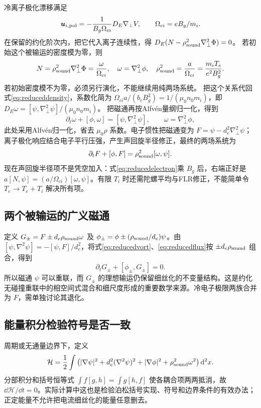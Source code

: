 \documentclass[UTF8,a4paper,11pt,openany,fontset=fandol]{ctexbook}
\begin{document}
冷离子极化漂移满足
\begin{equation}
\bm{u}_{i,\rm pol}=-{1\over B_g\Omega_{ci}}D_E\nabla_\perp V,
\qquad\Omega_{ci}=eB_g/m_i.
\end{equation}
在保留的约化阶次内，把它代入离子连续性，得
$D_E(N-\rho_{\rm sound}^2\nabla_\perp^2\Phi)=0$。
若初始这个被输运的密度模为零，则
\begin{equation}
N=\rho_{\rm sound}^2\nabla_\perp^2\Phi={\omega\over\Omega_{ci}},
\quad\omega=\nabla_\perp^2\phi,\quad
\rho_{\rm sound}^2={a\over\Omega_{ci}}={m_iT_e\over e^2B_g^2}.
\end{equation}
若初始密度模不为零，必须另行演化，不能继续用纯两场系统。
把这个关系代回式\eqref{eq:reduceddensity}，系数化简为
$\Omega_{ci}a/(b_eB_g^2)=1/(\mu_0n_0m_i)$，即
$D_E\omega=[\psi,\nabla_\perp^2\psi]/(\mu_0n_0m_i)$。
把磁通再按Alfvén量纲归一化，得到
\begin{equation}\partial_t\omega+[\phi,\omega]=[\psi,\nabla_\perp^2\psi],\qquad\omega=\nabla_\perp^2\phi,\label{eq:reducedvort}\end{equation}
此处采用Alfvén归一化，省去 $\mu_0\rho$ 系数。电子惯性把磁通变为 $F=\psi-d_e^2\nabla_\perp^2\psi$；离子极化响应结合电子平行压强，产生声回旋半径修正，最终的两场系统为
\begin{equation}\partial_tF+[\phi,F]=\rho_{\rm sound}^2[\omega,\psi].\label{eq:reducedflux}\end{equation}
现在声回旋半径项不是凭空加入：式\eqref{eq:reducedelectron}乘 $B_g$ 后，右端正好是 $a[N,\psi]=(a/\Omega_{ci})[\omega,\psi]$。有限 $T_i$ 时还需陀螺平均与FLR修正，不能简单令 $T_e\to T_e+T_i$ 解决所有项。

\subsection{两个被输运的广义磁通}
定义 $G_\pm=F\pm d_e\rho_{\rm sound}\omega$ 及
$\phi_\pm=\phi\pm(\rho_{\rm sound}/d_e)\psi$。由
$[\psi,\nabla^2\psi]=-[\psi,F]/d_e^2$，将式\eqref{eq:reducedvort}、\eqref{eq:reducedflux}按 $\pm d_e\rho_{\rm sound}$ 组合，得到
\begin{equation}\partial_tG_\pm+[\phi_\pm,G_\pm]=0.
\end{equation}
所以磁通 $\psi$ 可以重联，而 $G_\pm$ 的理想输运仍保留细丝化的不变量结构。这是约化无碰撞重联中的相空间式混合和细尺度形成的重要数学来源。冷电子极限两族合并为 $F$，需单独讨论其退化。\citep{Ottaviani1993,Schep1994,L049}

\subsection{能量积分检验符号是否一致}
周期或无通量边界下，定义
\begin{equation}\mathcal H={1\over2}\int\left(|\nabla\psi|^2+d_e^2(\nabla^2\psi)^2+|\nabla\phi|^2+\rho_{\rm sound}^2\omega^2\right)\mathrm d^2x.
\end{equation}
分部积分和括号恒等式 $\int f[g,h]=\int g[h,f]$ 使各耦合项两两抵消，故 $\dd\mathcal H/\dd t=0$。实际计算中这也是检验泊松括号实现、符号和边界条件的有效办法；正定能量不允许把电流细丝化的能量任意删去。
\end{document}
